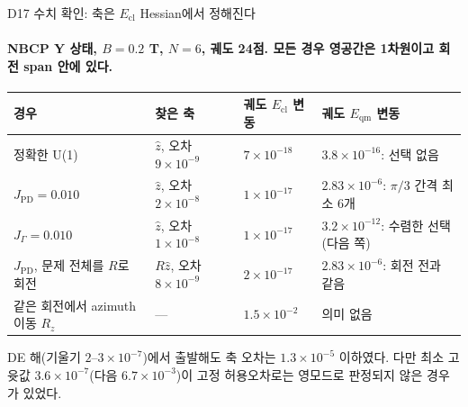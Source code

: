 \begin{frame}[label=state-selection-check]{D17 수치 확인: 축은 $E_{\mathrm{cl}}$ Hessian에서 정해진다}
  \framesubtitle{NBCP Y 상태, $B=0.2$ T, $N=6$, 궤도 24점. 모든 경우 영공간은 1차원이고 회전 span 안에 있다.}
  \small
  \begin{tabularx}{\textwidth}{@{}YP{2.6cm}P{2.3cm}P{4.2cm}@{}}
    \toprule
    경우 & 찾은 축 & 궤도 $E_{\mathrm{cl}}$ 변동 & 궤도 $E_{\mathrm{qm}}$ 변동 \\
    \midrule
    정확한 U(1) & $\hat z$, 오차 $9\times10^{-9}$ & $7\times10^{-18}$ & $3.8\times10^{-16}$: 선택 없음 \\
    $J_{\mathrm{PD}}=0.010$ & $\hat z$, 오차 $2\times10^{-8}$ & $1\times10^{-17}$ & $2.83\times10^{-6}$: $\pi/3$ 간격 최소 6개 \\
    $J_\Gamma=0.010$ & $\hat z$, 오차 $1\times10^{-8}$ & $1\times10^{-17}$ & $3.2\times10^{-12}$: 수렴한 선택(다음 쪽) \\
    $J_{\mathrm{PD}}$, 문제 전체를 $R$로 회전 & $R\hat z$, 오차 $8\times10^{-9}$ & $2\times10^{-17}$ & $2.83\times10^{-6}$: 회전 전과 같음 \\
    같은 회전에서 azimuth 이동 $R_z$ & --- & $1.5\times10^{-2}$ & 의미 없음 \\
    \bottomrule
  \end{tabularx}
  \par\medskip
  DE 해(기울기 $2$--$3\times10^{-7}$)에서 출발해도 축 오차는 $1.3\times10^{-5}$ 이하였다.
  다만 최소 고윳값 $3.6\times10^{-7}$(다음 $6.7\times10^{-3}$)이 고정 허용오차로는 영모드로 판정되지 않은 경우가 있었다.
  \par\medskip
\end{frame}


